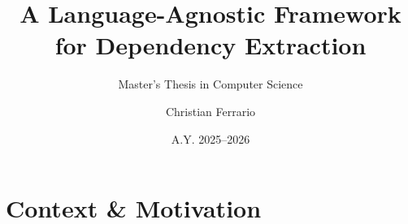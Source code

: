 \documentclass[aspectratio=169,10pt]{beamer}
\title[OmniDeps]{A Language-Agnostic Framework\\ for Dependency Extraction}
\subtitle{Master's Thesis in Computer Science}
\author[C. Ferrario]{Christian Ferrario}
\institute{University of Milano-Bicocca}
\date{A.Y. 2025--2026}
\begin{document}
\maketitle

\section{Context \& Motivation}
\end{document}
